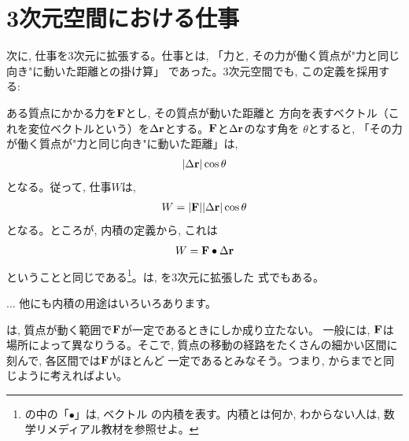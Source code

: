 \section{3次元空間における仕事}

次に, 仕事を3次元に拡張する。仕事とは, 「力と, その力が働く質点が"力と同じ向き"に動いた距離との掛け算」
であった。3次元空間でも, この定義を採用する:

ある質点にかかる力を${\bf F}$とし, その質点が動いた距離と
方向を表すベクトル（これを変位ベクトルという）を$\Delta{\bf r}$とする。${\bf F}$と$\Delta{\bf r}$のなす角を
$\theta$とすると, 「その力が働く質点が"力と同じ向き"に動いた距離」は, 
\begin{eqnarray} 
|\Delta{\bf r}|\cos\theta
\end{eqnarray} 
となる。従って, 仕事$W$は, 
\begin{eqnarray} 
W=|{\bf F}||\Delta{\bf r}|\cos\theta
\end{eqnarray} 
となる。ところが, 内積の定義から, これは
\begin{eqnarray} 
W={\bf F}\bullet\Delta{\bf r}\label{eq:work_Fdotdr}
\end{eqnarray} 
ということと同じである\footnote{の中の「$\bullet$」は, ベクトル
の内積を表す。内積とは何か, わからない人は, 
数学リメディアル教材を参照せよ。}。は, を3次元に拡張した
式でもある。

\begin{faq}{\small{} ... 
他にも内積の用途はいろいろあります。}\end{faq}\mv

は, 質点が動く範囲で${\bf F}$が一定であるときにしか成り立たない。
一般には, ${\bf F}$は場所によって異なりうる。そこで, 
質点の移動の経路をたくさんの細かい区間に刻んで, 各区間では${\bf F}$がほとんど
一定であるとみなそう。つまり, からまでと同じように考えればよい。

